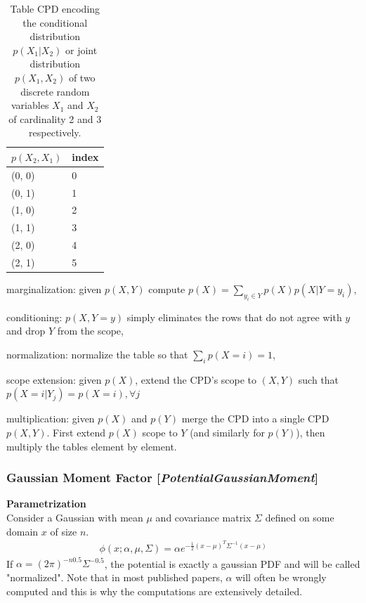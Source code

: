 \documentclass[11pt]{article}
\newcommand{\nllref}[1]{[\small{\textit{#1}}]}
\newcommand{\subsubsubsection}[1]{\noindent\textbf{#1}\\}
\begin{document}
\begin{table}[h]
\label{tablecpd1}
\centering
\begin{tabular}{| l | l |}
\hline
$p(X_2, X_1)$ & index\\
\hline\hline
(0, 0) & 0\\
\hline
(0, 1) & 1\\
\hline
(1, 0) & 2\\
\hline
(1, 1) & 3\\
\hline
(2, 0) & 4\\
\hline
(2, 1) & 5\\
\hline
\end{tabular}
\caption{Table CPD encoding the conditional distribution $p(X_1|X_2)$ or joint distribution $p(X_1,X_2)$ of two discrete random variables $X_1$ and $X_2$ of cardinality 2 and 3 respectively.}
\end{table}


\begin{compactitem}
\item marginalization: given $p(X,Y)$ compute $p(X) = \sum_{y_i \in Y}p(X)p(X|Y=y_i)$,
\item conditioning: $p(X,Y=y)$ simply eliminates the rows that do not agree with $y$ and drop $Y$ from the scope,
\item normalization: normalize the table so that $\sum_ip(X=i)=1$,
\item scope extension: given $p(X)$, extend the CPD's scope to $(X, Y)$ such that $p(X=i|Y_j) = p(X=i), \forall j$
\item multiplication: given $p(X)$ and $p(Y)$ merge the CPD into a single CPD $p(X,Y)$. First extend $p(X)$ scope to $Y$ (and similarly for $p(Y)$), then multiply the tables element by element.
\end{compactitem}

\subsubsection{Gaussian Moment Factor \nllref{PotentialGaussianMoment}}
\subsubsubsection{Parametrization}
Consider a Gaussian with mean $\mu$ and covariance matrix $\Sigma$ defined on some domain $x$ of size $n$.
\begin{align*}
\phi(x; \alpha, \mu, \Sigma) = \alpha  e^{-\frac{1}{2}(x-\mu)^T\Sigma^{-1}(x-\mu)}
\end{align*}
If $\alpha = (2\pi)^{-n0.5} \Sigma^{-0.5}$, the potential is exactly a gaussian PDF and will be called "normalized". Note that in most published papers, $\alpha$ will often be wrongly computed and this is why the computations are extensively detailed.
\end{document}

